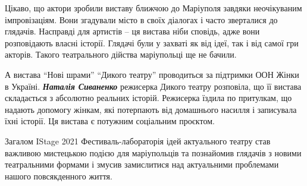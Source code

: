 

Цікаво, що актори зробили виставу ближчою до Маріуполя завдяки неочікуваним
імпровізаціям. Вони згадували місто в своїх діалогах і часто зверталися до
глядачів. Насправді для артистів – ця вистава ніби сповідь, адже вони
розповідають власні історії. Глядачі були у захваті як від ідеї, так і від
самої гри акторів. Такого театрального дійства маріупольці ще не бачили.


А вистава \enquote{Нові шрами} \enquote{Дикого театру} проводиться за підтримки ООН Жінки в
Україні. \emph{\textbf{Наталія Сиваненко}} режисерка Дикого театру розповіла, що її вистава
складається з абсолютно реальних історій. Режисерка їздила по притулкам, що
надають допомогу жінкам, які потерпають від домашнього насилля і записувала
їхні історії. Ця вистава є потужним соціальним проєктом.

Загалом IStage 2021 Фестиваль-лабораторія ідей актуального театру став важливою
мистецькою подією для маріупольців та познайомив глядачів з новими театральними
формами і змусив замислитися над актуальними проблемами нашого повсякденного
життя.
